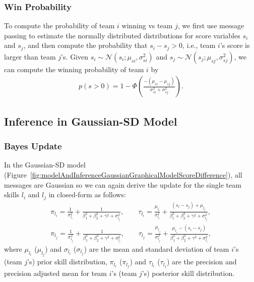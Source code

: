 \subsubsection{Win Probability} 
To compute the probability of team $i$ winning vs team $j$, we first use message
passing to estimate the normally distributed distributions for score
variables $s_i$ and $s_j$, and then compute the probability that
$s_i-s_j>0$, i.e., team $i$'s score is larger than team $j$'s. Given
$s_i\sim\mathcal{N}(s_i;\mu_{si},\sigma_{si}^2)$ and
$s_j\sim\mathcal{N}(s_j;\mu_{sj},\sigma_{sj}^2)$, we can compute the
winning probability of team $i$ by
\begin{align}
  p(s>0) = 1 - \Phi\left(\frac{-(\mu_{si}-\mu_{sj})}{\sigma_{si}^2+\sigma_{sj}^2}\right).
\end{align}

\subsection{Inference in Gaussian-SD Model}

\subsubsection{Bayes Update} 
In the Gaussian-SD model
(Figure~\ref{fig:modelAndInferenceGaussianGraphicalModelScoreDifference}),
all messages are Gaussian so we can again derive the update
for the single team skills $l_i$ and $l_j$ in closed-form
as follows:
\begin{align}
  \pi_{l_{i}}  =  \frac{1}{\sigma_{l_{i}}^2} + \frac{1}{\beta_1^2+\beta_2^2+\gamma^2+\sigma_{l_{j}}^2}, \qquad  \tau_{l_{i}} =    \frac{\mu_{l_{i}}}{\sigma_{l_{i}}^2} + \frac{(s_i-s_j)+\mu_{l_{j}}}{\beta_1^2+\beta_2^2+\gamma^2+\sigma_{l_{j}}^2},                                      \\
  \pi_{l_{j}}  =    \frac{1}{\sigma_{l_{j}}^2} + \frac{1}{\beta_1^2+\beta_2^2+\gamma^2+\sigma_{l_{i}}^2}, \qquad \tau_{l_{j}} =    \frac{\mu_{l_{j}}}{\sigma_{l_{j}}^2} + \frac{\mu_{l_{i}}-(s_i-s_j)}{\beta_1^2+\beta_2^2+\gamma^2+\sigma_{l_{i}}^2},
  \end{align}
where $\mu_{l_i}$ ($\mu_{l_j}$) and $\sigma_{l_i}$
      ($\sigma_{l_j}$) are the mean and standard deviation of team
      $i$'s (team $j$'s) prior skill distribution,
$\pi_{l_{i}}$ ($\pi_{l_{j}}$) and $\tau_{l_{i}}$
      ($\tau_{l_{j}}$) are the precision and precision adjusted mean
      for team $i$'s (team $j$'s) posterior skill distribution.

